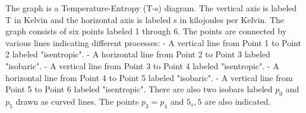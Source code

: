 The graph is a Temperature-Entropy (T-s) diagram. The vertical axis is labeled T in Kelvin and the horizontal axis is labeled s in kilojoules per Kelvin. The graph consists of six points labeled 1 through 6. The points are connected by various lines indicating different processes:
- A vertical line from Point 1 to Point 2 labeled "isentropic".
- A horizontal line from Point 2 to Point 3 labeled "isobaric".
- A vertical line from Point 3 to Point 4 labeled "isentropic".
- A horizontal line from Point 4 to Point 5 labeled "isobaric".
- A vertical line from Point 5 to Point 6 labeled "isentropic".
There are also two isobars labeled \( p_0 \) and \( p_5 \) drawn as curved lines. The points \( p_3 = p_4 \) and \( 5_s, 5 \) are also indicated.